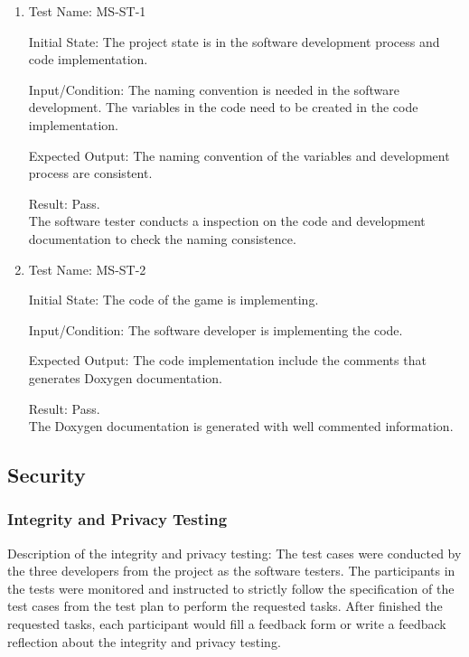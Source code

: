 \documentclass[12pt, titlepage]{article}
\begin{document}
\begin{enumerate}

\item{Test Name: MS-ST-1\\}

Initial State: The project state is in the software development process and code implementation.

Input/Condition: The naming convention is needed in the software development. The variables in the code need to be created in the code implementation.

Expected Output: The naming convention of the variables and development process are consistent.

Result: Pass. \\The software tester conducts a inspection on the code and development documentation to check the naming consistence.

\item{Test Name: MS-ST-2\\}

Initial State: The code of the game is implementing.

Input/Condition: The software developer is implementing the code.

Expected Output: The code implementation include the comments that generates Doxygen documentation.

Result: Pass. \\The Doxygen documentation is generated with well commented information.

\end{enumerate}

\subsection{Security}

\subsubsection{Integrity and Privacy Testing}
Description of the integrity and privacy testing: The test cases were conducted by the three developers from the project as the software testers. The participants in the tests were monitored and instructed to strictly follow the specification of the test cases from the test plan to perform the requested tasks. After finished the requested tasks, each participant would fill a feedback form or write a feedback reflection about the integrity and privacy testing.
\end{document}
